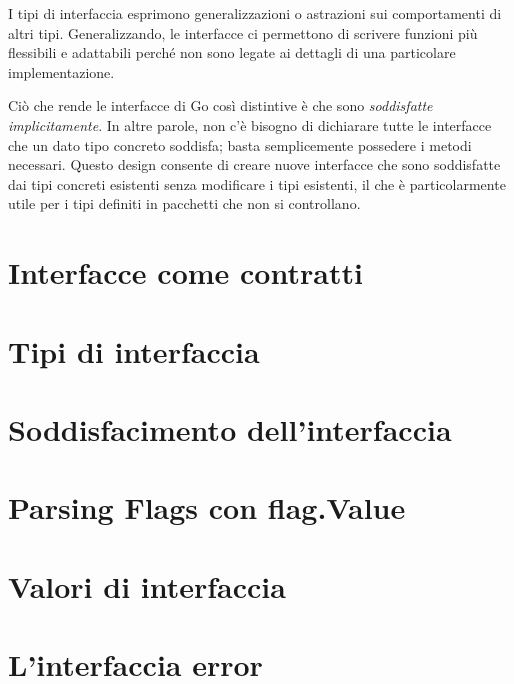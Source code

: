 I tipi di interfaccia esprimono generalizzazioni o astrazioni sui comportamenti di altri tipi.
Generalizzando, le interfacce ci permettono di scrivere funzioni più flessibili e adattabili perché non sono legate ai dettagli di una particolare implementazione.

Ciò che rende le interfacce di Go così distintive è che sono \textit{soddisfatte implicitamente}.
In altre parole, non c'è bisogno di dichiarare tutte le interfacce che un dato tipo concreto soddisfa;
basta semplicemente possedere i metodi necessari.
Questo design consente di creare nuove interfacce che sono soddisfatte dai tipi concreti esistenti senza modificare i tipi esistenti, il che è particolarmente utile per i tipi definiti in pacchetti che non si controllano.


\section{Interfacce come contratti}
\label{sec:interfacce_come_contratti}


\section{Tipi di interfaccia}
\label{sec:tipi_di_interfaccia}%



\section{Soddisfacimento dell'interfaccia}
\label{sec:soddisfacimento_interfaccia}


\section{Parsing Flags con flag.Value}
\label{sec:parsing_flags_con_flagvalue}


\section{Valori di interfaccia}
\label{sec:valori_di_interfaccia}


\section{L'interfaccia error}
\label{sec:interfaccia_error}%


